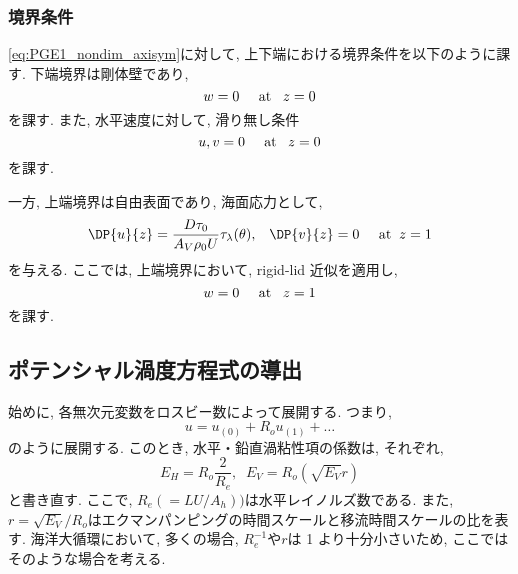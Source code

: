 \subsubsection*{境界条件}
\eqref{eq:PGE1_nondim_axisym}に対して, 上下端における境界条件を以下のように課す. 
下端境界は剛体壁であり, 
\begin{equation}
  w = 0 \;\;\;\;\; {\rm at} \;\;\; z=0
\end{equation}
を課す. 
また, 水平速度に対して, 滑り無し条件
\begin{equation}
  u, v = 0 \;\;\;\;\; {\rm at} \;\;\; z=0
\end{equation}
を課す. 

一方, 上端境界は自由表面であり, 海面応力として, 
\begin{equation}
  \DP{u}{z} = \dfrac{D \tau_0}{A_V \rho_0 U} \tau_\lambda(\theta), \;\;\; 
  \DP{v}{z} = 0  \;\;\;\;\; {\rm at} \;\; z=1
\end{equation}
を与える. 
ここでは, 上端境界において, rigid-lid 近似を適用し, 
\begin{equation}
  w = 0 \;\;\;\;\; {\rm at} \;\;\; z=1
\end{equation}
を課す. 

\subsection{ポテンシャル渦度方程式の導出}
始めに, 各無次元変数をロスビー数によって展開する.  
つまり, 
\begin{equation}
  u = u_{(0)} + R_o u_{(1)} + \dots
\end{equation}
のように展開する. 
このとき, 水平・鉛直渦粘性項の係数は, それぞれ, 
\begin{equation}
  E_H = R_o \dfrac{2}{R_e}, \;\; E_V = R_o (\sqrt{E_V} r)
\end{equation}
と書き直す. 
ここで, $R_e(=LU/A_h))$は水平レイノルズ数である. 
また, $r=\sqrt{E_V}/{R_o}$はエクマンパンピングの時間スケールと移流時間スケールの比を表す. 
海洋大循環において, 多くの場合, $R_e^{-1}$や$r$は 1 より十分小さいため, 
ここではそのような場合を考える. 

